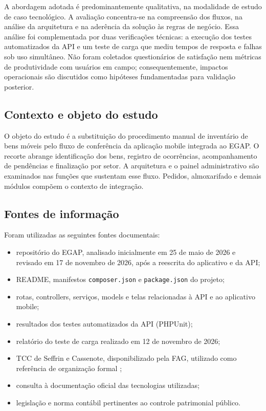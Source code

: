 \documentclass[12pt,a4paper]{article}
\begin{document}
A abordagem adotada é predominantemente qualitativa, na modalidade de estudo de caso tecnológico. A avaliação concentra-se na compreensão dos fluxos, na análise da arquitetura e na aderência da solução às regras de negócio. Essa análise foi complementada por duas verificações técnicas: a execução dos testes automatizados da API e um teste de carga que mediu tempos de resposta e falhas sob uso simultâneo. Não foram coletados questionários de satisfação nem métricas de produtividade com usuários em campo; consequentemente, impactos operacionais são discutidos como hipóteses fundamentadas para validação posterior.

\subsection{Contexto e objeto do estudo}

O objeto do estudo é a substituição do procedimento manual de inventário de bens móveis pelo fluxo de conferência da aplicação mobile integrada ao EGAP. O recorte abrange identificação dos bens, registro de ocorrências, acompanhamento de pendências e finalização por setor. A arquitetura e o painel administrativo são examinados nas funções que sustentam esse fluxo. Pedidos, almoxarifado e demais módulos compõem o contexto de integração.

\subsection{Fontes de informação}

Foram utilizadas as seguintes fontes documentais:

\begin{itemize}
    \item repositório do EGAP, analisado inicialmente em 25 de maio de 2026 e revisado em 17 de novembro de 2026, após a reescrita do aplicativo e da API;
    \item README, manifestos \texttt{composer.json} e \texttt{package.json} do projeto;
    \item rotas, controllers, serviços, models e telas relacionadas à API e ao aplicativo mobile;
    \item resultados dos testes automatizados da API (PHPUnit);
    \item relatório do teste de carga realizado em 12 de novembro de 2026;
    \item TCC de Seffrin e Cassenote, disponibilizado pela FAG, utilizado como referência de organização formal \cite{modelo-fag};
    \item consulta à documentação oficial das tecnologias utilizadas;
    \item legislação e norma contábil pertinentes ao controle patrimonial público.
\end{itemize}
\end{document}
